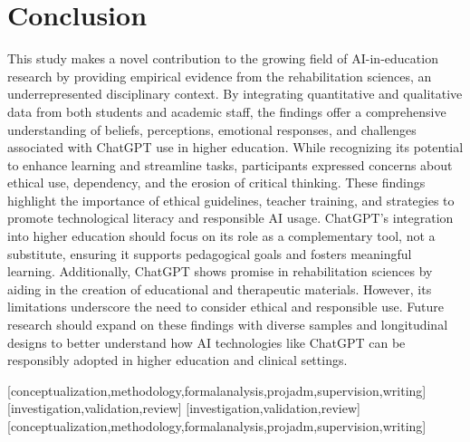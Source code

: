 \documentclass[english]{textolivre}
\begin{document}
\section{Conclusion}\label{sec-links}
This study makes a novel contribution to the growing field of AI-in-education research by providing empirical evidence from the rehabilitation sciences, an underrepresented disciplinary context. By integrating quantitative and qualitative data from both students and academic staff, the findings offer a comprehensive understanding of beliefs, perceptions, emotional responses, and challenges associated with ChatGPT use in higher education. While recognizing its potential to enhance learning and streamline tasks, participants expressed concerns about ethical use, dependency, and the erosion of critical thinking. These findings highlight the importance of ethical guidelines, teacher training, and strategies to promote technological literacy and responsible AI usage. ChatGPT’s integration into higher education should focus on its role as a complementary tool, not a substitute, ensuring it supports pedagogical goals and fosters meaningful learning. Additionally, ChatGPT shows promise in rehabilitation sciences by aiding in the creation of educational and therapeutic materials. However, its limitations underscore the need to consider ethical and responsible use. Future research should expand on these findings with diverse samples and longitudinal designs to better understand how AI technologies like ChatGPT can be responsibly adopted in higher education and clinical settings.


\printbibliography\label{sec-bib}


\begin{contributors}
[conceptualization,methodology,formalanalysis,projadm,supervision,writing]
[investigation,validation,review]
[investigation,validation,review]
[conceptualization,methodology,formalanalysis,projadm,supervision,writing]
\end{contributors}
\end{document}
